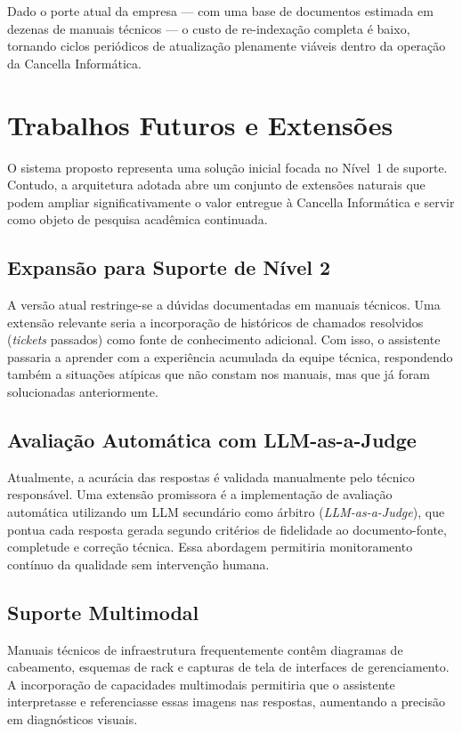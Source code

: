 \documentclass[a4paper,12pt,Times]{article}
\begin{document}
Dado o porte atual da empresa — com uma base de documentos estimada em dezenas de manuais
técnicos — o custo de re-indexação completa é baixo, tornando ciclos periódicos de
atualização plenamente viáveis dentro da operação da Cancella Informática.


\section{Trabalhos Futuros e Extensões}

O sistema proposto representa uma solução inicial focada no Nível~1 de suporte. Contudo,
a arquitetura adotada abre um conjunto de extensões naturais que podem ampliar
significativamente o valor entregue à Cancella Informática e servir como objeto de pesquisa
acadêmica continuada.

\subsection{Expansão para Suporte de Nível 2}

A versão atual restringe-se a dúvidas documentadas em manuais técnicos. Uma extensão
relevante seria a incorporação de históricos de chamados resolvidos (\textit{tickets}
passados) como fonte de conhecimento adicional. Com isso, o assistente passaria a aprender
com a experiência acumulada da equipe técnica, respondendo também a situações atípicas que
não constam nos manuais, mas que já foram solucionadas anteriormente.

\subsection{Avaliação Automática com LLM-as-a-Judge}

Atualmente, a acurácia das respostas é validada manualmente pelo técnico responsável. Uma
extensão promissora é a implementação de avaliação automática utilizando um LLM secundário
como árbitro (\textit{LLM-as-a-Judge}), que pontua cada resposta gerada segundo critérios
de fidelidade ao documento-fonte, completude e correção técnica. Essa abordagem permitiria
monitoramento contínuo da qualidade sem intervenção humana.

\subsection{Suporte Multimodal}

Manuais técnicos de infraestrutura frequentemente contêm diagramas de cabeamento, esquemas
de rack e capturas de tela de interfaces de gerenciamento. A incorporação de capacidades
multimodais permitiria que o assistente interpretasse e referenciasse essas imagens nas
respostas, aumentando a precisão em diagnósticos visuais.
\end{document}
